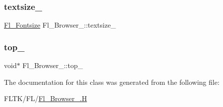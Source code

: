 \subsubsection{\texorpdfstring{textsize\+\_\+}{textsize\_}}
{\footnotesize\ttfamily \hyperlink{_enumerations_8_h_ad58927f5c691454480f7cd28362502f1}{Fl\+\_\+\+Fontsize} Fl\+\_\+\+Browser\+\_\+\+::textsize\+\_\+\hspace{0.3cm}{\ttfamily [private]}}

\mbox{\label{class_fl___browser___aacdf6ccc00b1046b82ebbb29549e8c9d}} 
\subsubsection{\texorpdfstring{top\+\_\+}{top\_}}
{\footnotesize\ttfamily void$\ast$ Fl\+\_\+\+Browser\+\_\+\+::top\+\_\+\hspace{0.3cm}{\ttfamily [private]}}



The documentation for this class was generated from the following file\+:\begin{DoxyCompactItemize}
\item 
F\+L\+T\+K/\+F\+L/\hyperlink{_fl___browser___8_h}{Fl\+\_\+\+Browser\+\_\+.\+H}\end{DoxyCompactItemize}

